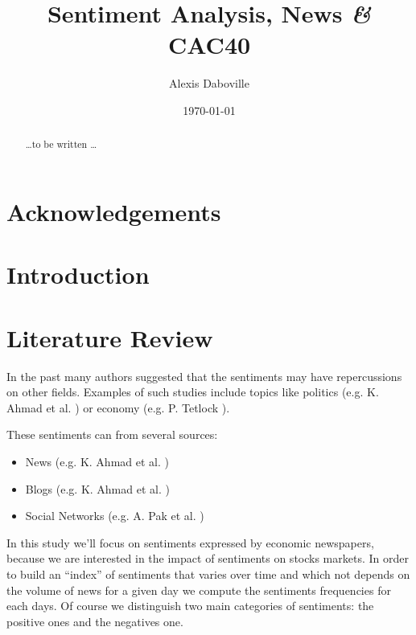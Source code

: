 \documentclass[12pt]{report}
\newcommand{\amp}{{\fontfamily{ppl}\selectfont\emph\&}}
\begin{document}
	\onehalfspace
	
	\title{Sentiment Analysis, News \amp{} CAC40}
	\date{\today}
	\author{Alexis Daboville}
	
	\maketitle
	
	\begin{abstract}
		\ldots to be written \ldots
	\end{abstract}
	
	\pagestyle{headings}
	\tableofcontents
	\listoffigures
	\listoftables
	
	\newpage
	
	\chapter*{Acknowledgements}
	
	\chapter{Introduction}
	
	\chapter{Literature Review}
		
		In the past many authors suggested that the sentiments may have repercussions on other fields. Examples of such studies include topics like politics (e.g. K. Ahmad et al. \cite{ahmad11}) or economy (e.g. P. Tetlock \cite{tetlock07}).
		
		These sentiments can from several sources:
		\begin{itemize}
			\item News (e.g. K. Ahmad et al. \cite{ahmad11})
			\item Blogs (e.g. K. Ahmad et al. \cite{ahmad11})
			\item Social Networks (e.g. A. Pak et al. \cite{pak10})
		\end{itemize}
		
		In this study we'll focus on sentiments expressed by economic newspapers, because we are interested in the impact of sentiments on stocks markets. In order to build an ``index'' of sentiments that varies over time and which not depends on the volume of news for a given day we compute the sentiments frequencies for each days. Of course we distinguish two main categories of sentiments: the positive ones and the negatives one.
		
\end{document}
